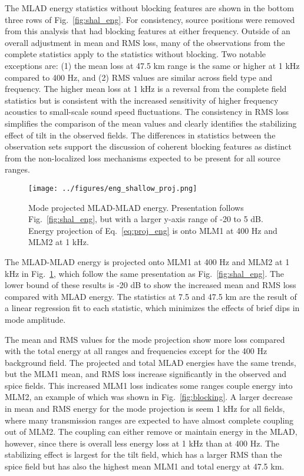 \documentclass[preprint,NumberedRefs]{JASA}
\begin{document}
The MLAD energy statistics without blocking features are shown in the bottom three rows of Fig.~\ref{fig:shal_eng}. For consistency, source positions were removed from this analysis that had blocking features at either frequency. Outside of an overall adjustment in mean and RMS loss, many of the observations from the complete statistics apply to the statistics without blocking. Two notable exceptions are: (1) the mean loss at 47.5 km range is the same or higher at 1 kHz compared to 400 Hz, and (2) RMS values are similar across field type and frequency. The higher mean loss at 1 kHz is a reversal from the complete field statistics but is consistent with the increased sensitivity of higher frequency acoustics to small-scale sound speed fluctuations. The consistency in RMS loss simplifies the comparison of the mean values and clearly identifies the stabilizing effect of tilt in the observed fields. The differences in statistics between the observation sets support the discussion of coherent blocking features as distinct from the non-localized loss mechanisms expected to be present for all source ranges.

\begin{figure}
\texttt{[image: ../figures/eng\_shallow\_proj.png]}
    \caption{Mode projected MLAD-MLAD energy. Presentation follows Fig.~\ref{fig:shal_eng}, but with a larger y-axis range of -20 to 5 dB. Energy projection of Eq.~\eqref{eq:proj_eng} is onto MLM1 at 400 Hz and MLM2 at 1 kHz.}
    \label{fig:shal_proj}
\end{figure}
The MLAD-MLAD energy is projected onto MLM1 at 400 Hz and MLM2 at 1 kHz in Fig.~\ref{fig:shal_proj}, which follow the same presentation as Fig.~\ref{fig:shal_eng}. The lower bound of these results is -20 dB to show the increased mean and RMS loss compared with MLAD energy. The statistics at 7.5 and 47.5 km are the result of a linear regression fit to each statistic, which minimizes the effects of brief dips in mode amplitude.

The mean and RMS values for the mode projection show more loss compared with the total energy at all ranges and frequencies except for the 400 Hz background field. The projected and total MLAD energies have the same trends, but the MLM1 mean, and RMS loss increase significantly in the observed and spice fields. This increased MLM1 loss indicates some ranges couple energy into MLM2, an example of which was shown in Fig.~\ref{fig:blocking}. A larger decrease in mean and RMS energy for the mode projection is seem 1 kHz for all fields, where many transmission ranges are expected to have almost complete coupling out of MLM2. The coupling can either remove or maintain energy in the MLAD, however, since there is overall less energy loss at 1 kHz than at 400 Hz. The stabilizing effect is largest for the tilt field, which has a larger RMS than the spice field but has also the highest mean MLM1 and total energy at 47.5 km.
\end{document}
